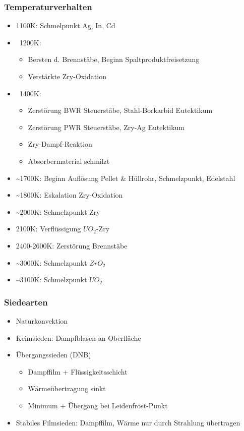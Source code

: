 \documentclass[12pt]{article}
\begin{document}
\subsubsection{Temperaturverhalten}
\begin{itemize}
  \item 1100K: Schmelpunkt Ag, In, Cd
  \item ~1200K:
  \begin{itemize}
    \item Bersten d. Brennstäbe, Beginn Spaltproduktfreisetzung
    \item Verstärkte Zry-Oxidation
  \end{itemize} 
  \item ~1400K:
  \begin{itemize}
    \item Zerstörung BWR Steuerstäbe, Stahl-Borkarbid Eutektikum
    \item Zerstörung PWR Steuerstäbe, Zry-Ag Eutektikum
    \item Zry-Dampf-Reaktion
    \item Absorbermaterial schmilzt
  \end{itemize}
  \item \textasciitilde 1700K: Beginn Auflösung Pellet \& Hüllrohr, Schmelzpunkt, Edelstahl
  \item \textasciitilde 1800K: Eskalation Zry-Oxidation
  \item \textasciitilde 2000K: Schmelzpunkt Zry
  \item 2100K: Verflüssigung \(UO_2\)-Zry
  \item 2400-2600K: Zerstörung Brennstäbe
  \item \textasciitilde 3000K: Schmelzpunkt \(ZrO_2\)
  \item \textasciitilde 3100K: Schmelzpunkt \(UO_2\)
\end{itemize}

\subsubsection{Siedearten}
\begin{itemize}
  \item Naturkonvektion
  \item Keimsieden: Dampfblasen an Oberfläche
  \item Übergangssieden (DNB)
  \begin{itemize}
    \item Dampffilm + Flüssigkeitsschicht
    \item Wärmeübertragung sinkt
    \item Minimum + Übergang bei Leidenfrost-Punkt
  \end{itemize}
  \item Stabiles Filmsieden: Dampffilm, Wärme nur durch Strahlung übertragen
\end{itemize}
\end{document}
